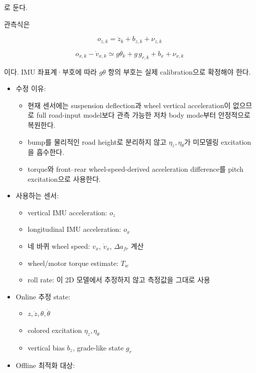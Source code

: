 \documentclass[letterpaper,10pt,journal,twocolumn]{ieeeconf}
\begin{document}
로 둔다.

관측식은

\[
o_{z,k}
=
\ddot z_k+b_{z,k}+\nu_{z,k}
\]

\[
o_{x,k}-\dot v_{x,k}
\simeq
g\theta_k+g\,g_{r,k}+b_x+\nu_{x,k}
\]

이다. IMU 좌표계·부호에 따라 \(g\theta\) 항의 부호는 실제 calibration으로 확정해야 한다.

\begin{itemize}

\item
  수정 이유:

  \begin{itemize}
  
  \item
    현재 센서에는 suspension deflection과 wheel vertical acceleration이 없으므로 full road-input model보다 관측 가능한 저차 body mode부터 안정적으로 복원한다.
  \item
    bump를 물리적인 road height로 분리하지 않고 \(\eta_z,\eta_\theta\)가 미모델링 excitation을 흡수한다.
  \item
    torque와 front--rear wheel-speed-derived acceleration difference를 pitch excitation으로 사용한다.
  \end{itemize}
\item
  사용하는 센서:

  \begin{itemize}
  
  \item
    vertical IMU acceleration: \(o_z\)
  \item
    longitudinal IMU acceleration: \(o_x\)
  \item
    네 바퀴 wheel speed: \(v_x\), \(\dot v_x\), \(\Delta a_{fr}\) 계산
  \item
    wheel/motor torque estimate: \(T_w\)
  \item
    roll rate: 이 2D 모델에서 추정하지 않고 측정값을 그대로 사용
  \end{itemize}
\item
  Online 추정 state:

  \begin{itemize}
  
  \item
    \(z,\dot z,\theta,\dot\theta\)
  \item
    colored excitation \(\eta_z,\eta_\theta\)
  \item
    vertical bias \(b_z\), grade-like state \(g_r\)
  \end{itemize}
\item
  Offline 최적화 대상:


\end{itemize}
\end{document}

